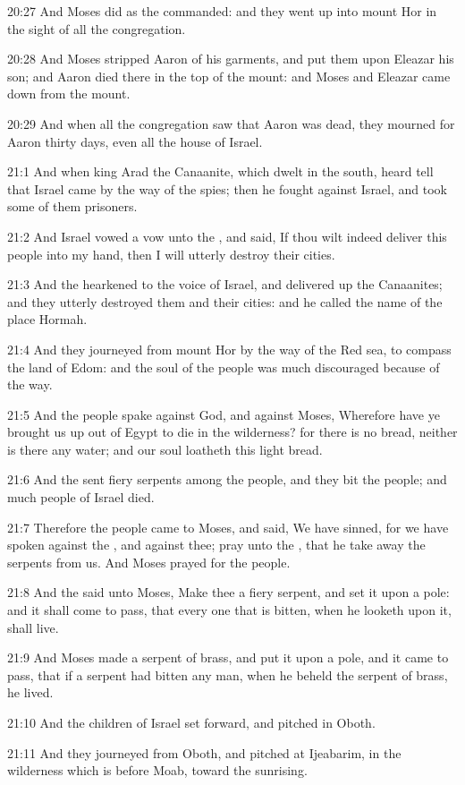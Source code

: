 20:27 And Moses did as the \LORD commanded: and they went up into mount
Hor in the sight of all the congregation.

20:28 And Moses stripped Aaron of his garments, and put them upon
Eleazar his son; and Aaron died there in the top of the mount: and
Moses and Eleazar came down from the mount.

20:29 And when all the congregation saw that Aaron was dead, they
mourned for Aaron thirty days, even all the house of Israel.

21:1 And when king Arad the Canaanite, which dwelt in the south, heard
tell that Israel came by the way of the spies; then he fought against
Israel, and took some of them prisoners.

21:2 And Israel vowed a vow unto the \LORD, and said, If thou wilt
indeed deliver this people into my hand, then I will utterly destroy
their cities.

21:3 And the \LORD hearkened to the voice of Israel, and delivered up
the Canaanites; and they utterly destroyed them and their cities: and
he called the name of the place Hormah.

21:4 And they journeyed from mount Hor by the way of the Red sea, to
compass the land of Edom: and the soul of the people was much
discouraged because of the way.

21:5 And the people spake against God, and against Moses, Wherefore
have ye brought us up out of Egypt to die in the wilderness? for there
is no bread, neither is there any water; and our soul loatheth this
light bread.

21:6 And the \LORD sent fiery serpents among the people, and they bit
the people; and much people of Israel died.

21:7 Therefore the people came to Moses, and said, We have sinned, for
we have spoken against the \LORD, and against thee; pray unto the \LORD,
that he take away the serpents from us. And Moses prayed for the
people.

21:8 And the \LORD said unto Moses, Make thee a fiery serpent, and set
it upon a pole: and it shall come to pass, that every one that is
bitten, when he looketh upon it, shall live.

21:9 And Moses made a serpent of brass, and put it upon a pole, and it
came to pass, that if a serpent had bitten any man, when he beheld the
serpent of brass, he lived.

21:10 And the children of Israel set forward, and pitched in Oboth.

21:11 And they journeyed from Oboth, and pitched at Ijeabarim, in the
wilderness which is before Moab, toward the sunrising.

